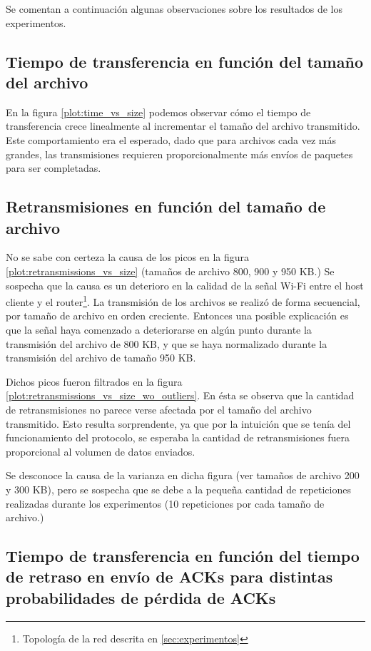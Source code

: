 \documentclass[a4paper, 10pt, twoside]{article}
\begin{document}
Se comentan a continuación algunas observaciones sobre los resultados de los experimentos.


\subsection{Tiempo de transferencia en función del tamaño del archivo}

En la figura \ref{plot:time_vs_size} podemos observar cómo el tiempo de transferencia crece linealmente al incrementar el tamaño del archivo transmitido. Este comportamiento era el esperado, dado que para archivos cada vez más grandes, las transmisiones requieren proporcionalmente más envíos de paquetes para ser completadas.


\subsection{Retransmisiones en función del tamaño de archivo}
\label{sec:discusion-retransmisiones-vs-tam}

No se sabe con certeza la causa de los picos en la figura \ref{plot:retransmissions_vs_size} (tamaños de archivo 800, 900 y 950 KB.) Se sospecha que la causa es un deterioro en la calidad de la señal Wi-Fi entre el host cliente y el router\footnote{Topología de la red descrita en \ref{sec:experimentos}}. La transmisión de los archivos se realizó de forma secuencial, por tamaño de archivo en orden creciente. Entonces una posible explicación es que la señal haya comenzado a deteriorarse en algún punto durante la transmisión del archivo de 800 KB, y que se haya normalizado durante la transmisión del archivo de tamaño 950 KB.

Dichos picos fueron filtrados en la figura \ref{plot:retransmissions_vs_size_wo_outliers}. En ésta se observa que la cantidad de retransmisiones no parece verse afectada por el tamaño del archivo transmitido. Esto resulta sorprendente, ya que por la intuición que se tenía del funcionamiento del protocolo, se esperaba la cantidad de retransmisiones fuera proporcional al volumen de datos enviados.

Se desconoce la causa de la varianza en dicha figura (ver tamaños de archivo 200 y 300 KB), pero se sospecha que se debe a la pequeña cantidad de repeticiones realizadas durante los experimentos (10 repeticiones por cada tamaño de archivo.)


\subsection{Tiempo de transferencia en función del tiempo de retraso en envío de ACKs para distintas probabilidades de pérdida de ACKs}
\end{document}
